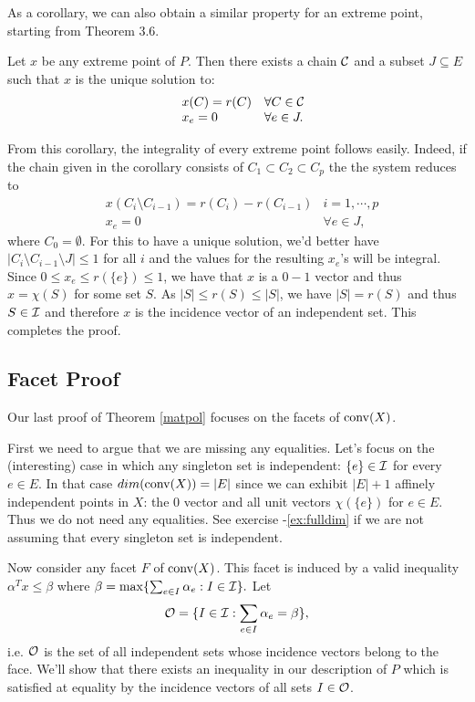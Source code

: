 \documentclass[12pt]{article}
\begin{document}
As a corollary, we can also obtain a similar property for an extreme
point, starting from Theorem 3.6. 

\begin{corollary}
Let $x$ be any extreme point of $P$. Then there exists a chain ${\cal C}$ and
a subset $J\subseteq E$ such that $x$ is the unique solution to:
$$\begin{array}{rll} 
& x(C) =r(C) & \forall C\in {\cal C} \\
& x_e = 0 & \forall e\in J.
\end{array}$$
\end{corollary}

From this corollary, the integrality of every extreme point follows
easily. Indeed, if the chain given in the corollary consists of
$C_1\subset C_2 \subset C_p$ the the system reduces to 
$$\begin{array}{rll} 
& x(C_{i}\setminus C_{i-1}) =r(C_{i})-r(C_{i-1}) & i=1,\cdots,p\\
& x_e = 0 & \forall e\in J,
\end{array}$$
where $C_0=\emptyset$. For this to have a unique solution, we'd better
have $|C_i\setminus C_{i-1}\setminus J|\leq 1$ for all $i$ and the
values for the resulting $x_e$'s will be integral. Since $0\leq x_e
\leq r(\{e\}) \leq 1$, we have that $x$ is a $0-1$ vector and thus
$x=\chi(S)$ for some set $S$. As $|S|\leq r(S) \leq |S|$, we have
$|S|=r(S)$ and thus $S\in {\cal I}$ and therefore $x$ is the incidence
vector of an independent set. This completes the proof. 


\subsection{Facet Proof}
Our last proof of Theorem \ref{matpol} focuses on the facets of
$\operatorname{conv}(X)$. 

First we need to argue that we are missing any equalities. Let's focus
on the (interesting) case in which any singleton set is independent:
$\{e\}\in {\cal I}$ for every $e\in E$. In that case
$dim(\operatorname{conv}(X))=|E|$ since we can exhibit $|E|+1$ affinely independent
points in $X$: the 0 vector and all unit vectors $\chi(\{e\})$ for
$e\in E$. Thus we do not need any equalities. See exercise
-\ref{ex:fulldim} if we are not assuming that every singleton set is
independent. 

Now consider any facet $F$ of $\operatorname{conv}(X)$. This facet is induced by a
valid inequality $\alpha^T x\leq \beta$ where $\beta=\max\{\sum_{e\in
  I} \alpha_e: I\in {\cal I}\}.$ Let $${\cal O}=\{I\in {\cal I}:  \sum_{e\in
  I} \alpha_e=\beta\},$$ i.e. ${\cal O}$ is the set of all independent sets
whose incidence vectors belong to the face. We'll show that there
exists an inequality in our description of $P$ which is satisfied at
equality by the incidence vectors of all sets $I\in {\cal O}$.
\end{document}
